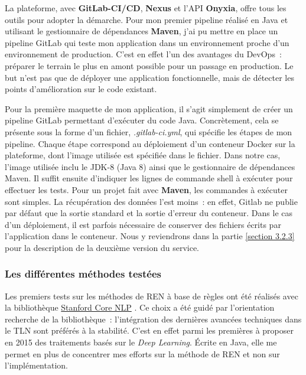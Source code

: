 La plateforme, avec \textbf{GitLab-CI/CD}, \textbf{Nexus} et l'API \textbf{Onyxia}, offre tous les outils pour adopter la démarche. Pour mon premier pipeline réalisé en Java et utilisant le gestionnaire de dépendances \textbf{Maven}, j'ai pu mettre en place un pipeline GitLab qui teste mon application dans un environnement proche d'un environnement de production. C'est en effet l'un des avantages du DevOps~: préparer le terrain le plus en amont possible pour un passage en production. Le but n'est pas que de déployer une application fonctionnelle, mais de détecter les points d'amélioration sur le code existant. 
\newline

Pour la première maquette de mon application, il s'agit simplement de créer un pipeline GitLab permettant d'exécuter du code Java. Concrètement, cela se présente sous la forme d'un fichier, \textit{.gitlab-ci.yml}, qui spécifie les étapes de mon pipeline. Chaque étape correspond au déploiement d'un conteneur Docker sur la plateforme, dont l'image utilisée est spécifiée dans le fichier. Dans notre cas, l'image utilisée inclu le JDK-8 (Java 8) ainsi que le gestionnaire de dépendances Maven. Il suffit ensuite d'indiquer les lignes de commande shell à exécuter pour effectuer les tests. Pour un projet fait avec \textbf{Maven}, les commandes à exécuter sont simples. La récupération des données l'est moins~: en effet, Gitlab ne publie par défaut que la sortie standard et la sortie d'erreur du conteneur. Dans le cas d'un déploiement, il est parfois nécessaire de conserver des fichiers écrits par l'application dans le conteneur. Nous y reviendrons dans la partie \ref{section 3.2.3} pour la description de la deuxième version du service.
\label{section 2.2.3}

\subsubsection{Les différentes méthodes testées}
Les premiers tests sur les méthodes de REN à base de règles ont été réalisés avec la bibliothèque \href{https://stanfordnlp.github.io/CoreNLP/}{Stanford Core NLP} \cite{corenlp-doc}. Ce choix a été guidé par l'orientation recherche de la bibliothèque~: l'intégration des dernières avancées techniques dans le TLN sont préférés à la stabilité. C'est en effet parmi les premières à proposer en 2015 des traitements basés sur le \textit{Deep Learning}. Écrite en Java, elle me permet en plus de concentrer mes efforts sur la méthode de REN et non sur l'implémentation. 
\newline

